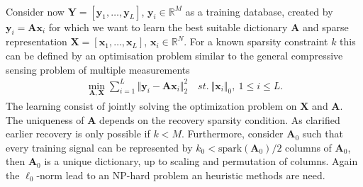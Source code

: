 \\
Consider now $\textbf{Y}=\left[ \textbf{y}_1, \dots ,\textbf{y}_L \right]$, $\textbf{y}_i\in \mathbb{R}^{M}$ as a training database, created by $\textbf{y}_i=\textbf{A}\textbf{x}_i$ for which we want to learn the best suitable dictionary $\textbf{A}$ and sparse representation $\textbf{X}=\left[ \textbf{x}_1, \dots ,\textbf{x}_L \right]$, $\textbf{x}_i\in \mathbb{R}^{N}$. For a known sparsity constraint $k$ this can be defined by an optimisation problem similar to the general compressive sensing problem of multiple measurements \cite{Elad_book}
\begin{align}
\min_{\mathbf{A,X}} \sum_{i=1}^{L} \Vert \mathbf{y} _i - \mathbf{Ax}_i \Vert_2^2 \quad st. \ \Vert \textbf{x}_i\Vert_0, \ 1\leq i \leq L.\label{eq:SVD1}
\end{align}  
The learning consist of jointly solving the optimization problem on $\textbf{X}$ and $\textbf{A}$. The uniqueness of $\textbf{A}$ depends on the recovery sparsity condition. As clarified earlier recovery is only possible if $k < M$\cite{phd2015}. Furthermore, consider $\textbf{A}_0$ such that every training signal can be represented by $k_0 < \text{spark}(\textbf{A}_0)/2$ columns of $\textbf{A}_0$, then $\textbf{A}_0$ is a unique dictionary, up to scaling and permutation of columns\cite{Elad_book}. Again the $\ell_0$-norm lead to an NP-hard problem an heuristic methods are need.     

